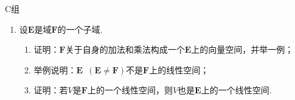 \centerline{\heiti C组}
\begin{enumerate}
    \item 设$\mathbf{E}$是域$\mathbf{F}$的一个子域.
    \begin{enumerate}[label=(\arabic*)]
        \item 证明：$\mathbf{F}$关于自身的加法和乘法构成一个$\mathbf{E}$上的向量空间，并举一例；

        \item 举例说明：$\mathbf{E}\enspace(\mathbf{E}\neq \mathbf{F})$不是$\mathbf{F}$上的线性空间；

        \item 证明：若$V$是$\mathbf{F}$上的一个线性空间，则$V$也是$\mathbf{E}$上的一个线性空间.
    \end{enumerate}
\end{enumerate}
